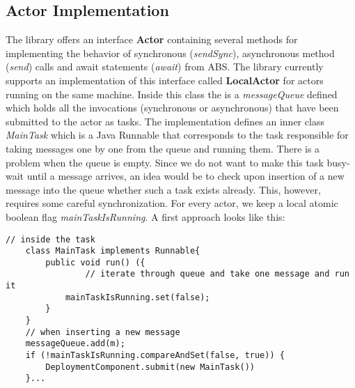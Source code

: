 
\subsection{Actor Implementation}
The library offers an interface \textbf{Actor} containing several methods for implementing the behavior of synchronous (\textit{sendSync}), asynchronous method (\textit{send}) calls and await statements (\textit{await}) from ABS. The library currently supports an implementation of this interface called \textbf{LocalActor} for actors running on the same machine. Inside this class the is a \textit{messageQueue} defined which holds all the invocations (synchronous or asynchronous) that have been submitted to the actor as tasks. The implementation defines an inner class \textit{MainTask} which is a Java Runnable that corresponds to the task responsible for taking messages one by one from the queue and running them. There is a problem when the queue is empty. Since we do not want to make this task busy-wait until a message arrives, an idea would be to check upon insertion of a new message into the queue whether such a task exists already. This, however, requires some careful synchronization. For every actor, we keep a local atomic boolean flag \textit{mainTaskIsRunning}. A first approach looks like this:

\begin{lstlisting}[caption= Basic Synchronization for the Demand-Driven Approach]
	// inside the task
	class MainTask implements Runnable{
		public void run() ({
				// iterate through queue and take one message and run it
			mainTaskIsRunning.set(false);
		}
	}
	// when inserting a new message
	messageQueue.add(m);
	if (!mainTaskIsRunning.compareAndSet(false, true)) {
		DeploymentComponent.submit(new MainTask())
	}...
\end{lstlisting}

